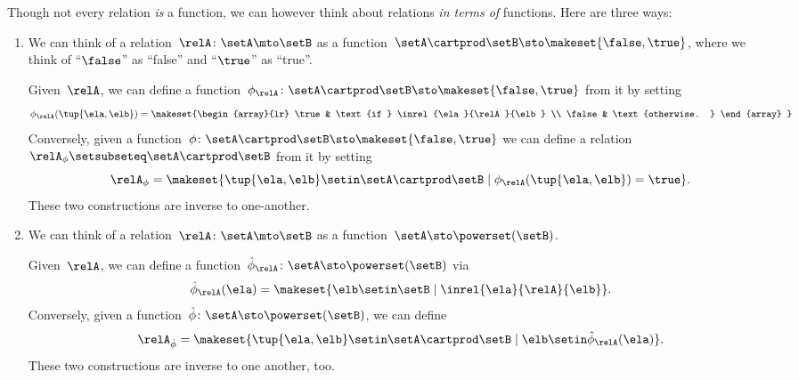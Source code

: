 \label{rem:rel-three-fun-descriptions}
Though not every relation \emph{is} a function, we can however think about relations \emph{in terms of} functions.
Here are three ways:
\begin{enumerate}
    \item We can think of a relation~$\relA \colon \setA \mto\setB$ as a function~$\setA \cartprod \setB \sto \makeset{ \false, \true }$, where we think of ``$\false$'' as ``false'' and ``$\true$'' as ``true''.

          Given~$\relA$, we can define a function~$\phi_{\relA} \colon \setA \cartprod \setB \sto \makeset{ \false, \true }$ from it by setting
          \begin{equation*}
              \phi_{\relA}(\tup{\ela, \elb}) =
              \makeset{\begin{array}{lr}
                      \true  & \text{if } \inrel{\ela}{\relA}{\elb} \\
                      \false & \text{otherwise.
                      }
                  \end{array}
              }
          \end{equation*}
          Conversely, given a function~$\phi\colon \setA \cartprod \setB \sto \makeset{ \false, \true }$ we can define a relation~$\relA_{\phi} \setsubseteq \setA \cartprod \setB$ from it by setting
          \begin{equation*}
              \relA_{\phi} = \makeset{ \tup{\ela, \elb} \setin \setA \cartprod \setB \mid \phi_{\relA}(\tup{\ela, \elb}) = \true }.
          \end{equation*}
          These two constructions are inverse to one-another.

    \item We can think of a relation~$\relA \colon \setA \mto \setB$ as a function~$\setA  \sto \powerset (\setB)$.

          Given~$\relA$, we can define a function~$\hat \phi_{\relA} \colon \setA \sto \powerset (\setB)$ via
          \begin{equation*}
              \hat \phi_{\relA} (\ela) = \makeset{ \elb \setin \setB \mid \inrel{\ela}{\relA}{\elb}}.
          \end{equation*}
          Conversely, given a function~$\hat \phi \colon \setA \sto \powerset (\setB)$, we can define
          \begin{equation*}
              \relA_{\hat \phi} = \makeset{ \tup{\ela, \elb} \setin \setA \cartprod \setB \mid \elb \setin \hat \phi_{\relA}(\ela)   }.
          \end{equation*}
          These two constructions are inverse to one another, too.


\end{enumerate}
